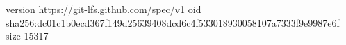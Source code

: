 version https://git-lfs.github.com/spec/v1
oid sha256:dc01c1b0ecd367f149d25639408dcd6c4f533018930058107a7333f9e9987e6f
size 15317
